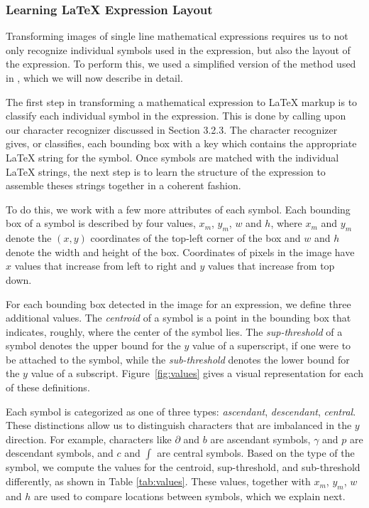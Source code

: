 \documentclass[10pt]{IEEEtran}
\newcommand{\latex}{\LaTeX\xspace}
\begin{document}
\subsubsection{Learning \latex Expression Layout}

Transforming images of single line mathematical expressions requires us to not only recognize individual symbols used in the expression, but also the layout of the expression. To perform this, we used a simplified version of the method used in \cite{4}, which we will now describe in detail.

The first step in transforming a mathematical expression to \latex markup is to classify each individual symbol in the expression. This is done by calling upon our character recognizer discussed in Section 3.2.3. The character recognizer gives, or classifies, each bounding box with a key which contains the appropriate \latex string for the symbol. Once symbols are matched with the individual \latex strings, the next step is to learn the structure of the expression to assemble theses strings together in a coherent fashion.

To do this, we work with a few more attributes of each symbol. Each bounding box of a symbol is described by four values, $x_m$, $y_m$, $w$ and $h$, where $x_m$ and $y_m$ denote the $(x,y)$ coordinates of the top-left corner of the box and $w$ and $h$ denote the width and height of the box. Coordinates of pixels in the image have $x$ values that increase from left to right and $y$ values that increase from top down.

For each bounding box detected in the image for an expression, we define three additional values. The \textit{centroid} of a symbol is a point in the bounding box that indicates, roughly, where the center of the symbol lies. The \textit{sup-threshold} of a symbol denotes the upper bound for the $y$ value of a superscript, if one were to be attached to the symbol, while the \textit{sub-threshold} denotes the lower bound for the $y$ value of a subscript. Figure~\ref{fig:values} gives a visual representation for each of these definitions.

Each symbol is categorized as one of three types: \textit{ascendant}, \textit{descendant}, \textit{central}. These distinctions allow us to distinguish characters that are imbalanced in the $y$ direction. For example, characters like $\partial$ and $b$ are ascendant symbols, $\gamma$ and $p$ are descendant symbols, and $c$ and $\int$ are central symbols. Based on the type of the symbol, we compute the values for the centroid, sup-threshold, and sub-threshold differently, as shown in Table \ref{tab:values}. These values, together with $x_m$, $y_m$, $w$ and $h$ are used to compare locations between symbols, which we explain next.
\end{document}
